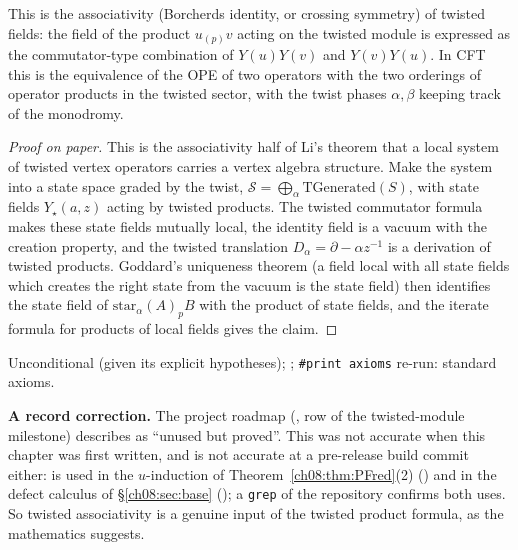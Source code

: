 \begin{physics}
This is the associativity (Borcherds identity, or crossing symmetry) of twisted fields: the field of the product $u_{(p)}v$ acting on the twisted module is expressed as the commutator-type combination of $Y(u)Y(v)$ and $Y(v)Y(u)$. In CFT this is the equivalence of the OPE of two operators with the two orderings of operator products in the twisted sector, with the twist phases $\alpha,\beta$ keeping track of the monodromy.
\end{physics}
\begin{proof}[Proof on paper]
This is the associativity half of Li's theorem that a local system of twisted vertex operators
carries a vertex algebra structure.  Make the system into a state space graded by the twist,
$\mathcal S=\bigoplus_\alpha\mathrm{TGenerated}(S)$, with state fields $Y_\star(a,z)$ acting by twisted
products.  The twisted commutator formula makes these state fields mutually local, the identity
field is a vacuum with the creation property, and the twisted translation
$D_\alpha=\partial-\alpha z^{-1}$ is a derivation of twisted products.  Goddard's uniqueness
theorem (a field local with all state fields which creates the right state from the vacuum is the
state field) then identifies the state field of $\mathrm{star}_\alpha(A)_pB$ with the product of
state fields, and the iterate formula for products of local fields gives the claim.
\end{proof}
\begin{status}
Unconditional (given its explicit hypotheses); ;
\texttt{\#print axioms}  re-run: standard axioms.
\end{status}
\begin{warning}
\textbf{A record correction.}  The project roadmap (, row of the twisted-module milestone)
describes  as ``unused but proved''.  This was not accurate when this chapter
was first written, and is not accurate at a pre-release build commit either:  is used in the $u$-induction of
Theorem~\ref{ch08:thm:PFred}(2) () and in the defect
calculus of \S\ref{ch08:sec:base} (); a \texttt{grep} of the
repository confirms both uses.  So twisted associativity is a genuine input of the twisted product
formula, as the mathematics suggests.
\end{warning}

